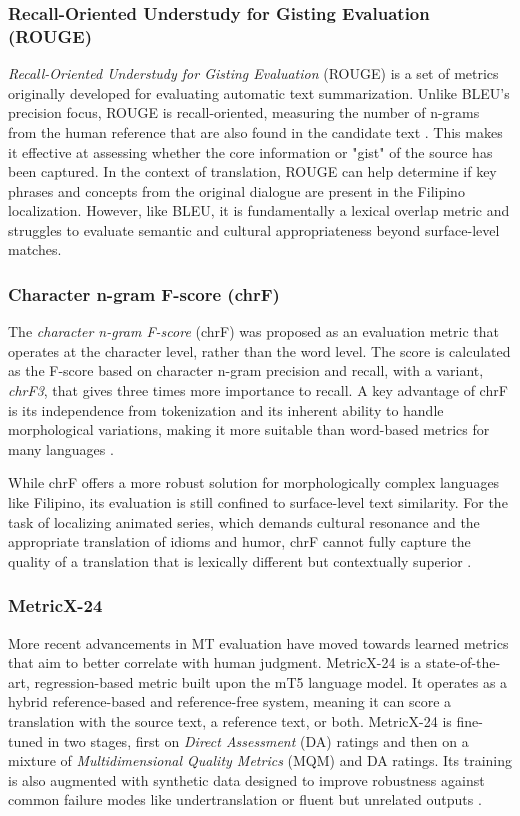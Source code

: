 \documentclass[conference]{IEEEtran}
\begin{document}
\subsubsection{Recall-Oriented Understudy for Gisting Evaluation (ROUGE)}

\textit{Recall-Oriented Understudy for Gisting Evaluation} (ROUGE) is a set of metrics originally developed for evaluating automatic text summarization. Unlike BLEU's precision focus, ROUGE is recall-oriented, measuring the number of n-grams from the human reference that are also found in the candidate text \cite{lin_rouge_2004}. This makes it effective at assessing whether the core information or "gist" of the source has been captured. In the context of translation, ROUGE can help determine if key phrases and concepts from the original dialogue are present in the Filipino localization. However, like BLEU, it is fundamentally a lexical overlap metric and struggles to evaluate semantic and cultural appropriateness beyond surface-level matches.

\subsubsection{Character n-gram F-score (chrF)}

The \textit{character n-gram F-score} (chrF) was proposed as an evaluation metric that operates at the character level, rather than the word level. The score is calculated as the F-score based on character n-gram precision and recall, with a variant, \textit{chrF3}, that gives three times more importance to recall. A key advantage of chrF is its independence from tokenization and its inherent ability to handle morphological variations, making it more suitable than word-based metrics for many languages \cite{popovic_chrf_2015}.

While chrF offers a more robust solution for morphologically complex languages like Filipino, its evaluation is still confined to surface-level text similarity. For the task of localizing animated series, which demands cultural resonance and the appropriate translation of idioms and humor, chrF cannot fully capture the quality of a translation that is lexically different but contextually superior \cite{montalan_batayan_2025}.

\subsubsection{MetricX-24}

More recent advancements in MT evaluation have moved towards learned metrics that aim to better correlate with human judgment. MetricX-24 is a state-of-the-art, regression-based metric built upon the mT5 language model. It operates as a hybrid reference-based and reference-free system, meaning it can score a translation with the source text, a reference text, or both. MetricX-24 is fine-tuned in two stages, first on \textit{Direct Assessment} (DA) ratings and then on a mixture of \textit{Multidimensional Quality Metrics} (MQM) and DA ratings. Its training is also augmented with synthetic data designed to improve robustness against common failure modes like undertranslation or fluent but unrelated outputs \cite{juraska_metricx-24_2024,montalan_batayan_2025}.
\end{document}
